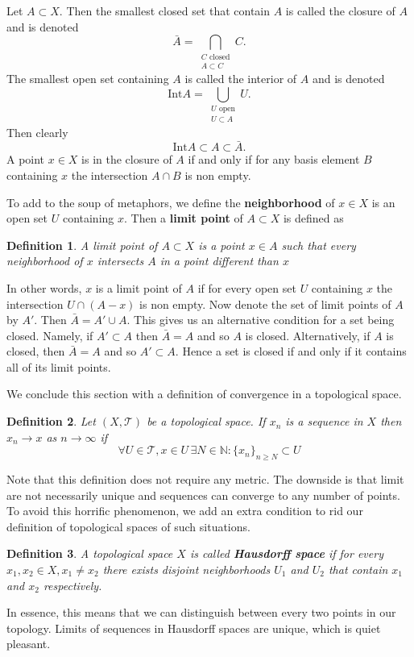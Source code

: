 \documentclass{article}
\newcommand{\Ta}{\mathcal{T}}
\newcommand{\N}{\mathbb{N}}
\newtheorem*{definition}{Definition}
\theoremstyle{remark}
\begin{document}
Let $A\subset X$. Then the smallest closed set that contain $A$ is called the closure of $A$ and is denoted 
$$\bar{A}=\bigcap_{\substack{C\text{ closed}\\A\subset C}} C.$$
The smallest open set containing $A$ is called the interior of $A$ and is denoted 
$$\text{Int} A = \bigcup_{\substack{U\text{ open}\\U\subset A}}U.$$ 
Then clearly
$$
    \text{Int}A\subset A\subset\bar{A}.
$$
A point $x\in X$ is in the closure of $A$ if and only if for any basis element $B$ containing $x$ the intersection $A\cap B$ is non empty.

To add to the soup of metaphors, we define the \textbf{neighborhood} of $x\in X$ is an open set $U$ containing $x$. Then a \textbf{limit point} of $A\subset X$ is defined as
\begin{definition}
    A limit point of $A\subset X$ is a point $x\in A$ such that every neighborhood of $x$ intersects $A$ in a point different than $x$
\end{definition}
In other words, $x$ is a limit point of $A$ if for every open set $U$ containing $x$ the intersection $U\cap(A-{x})$ is non empty. Now denote the set of limit points of $A$ by $A'$.
Then $\bar{A}=A'\cup A$. This gives us an alternative condition for a set being closed. Namely, if $A'\subset A$ then $\bar{A}=A$ and so $A$ is closed.
Alternatively, if $A$ is closed, then $\bar{A}=A$ and so $A'\subset A$.
Hence a set is closed if and only if it contains all of its limit points.

We conclude this section with a definition of convergence in a topological space.
\begin{definition}
    Let $(X,\Ta)$ be a topological space. If $x_n$ is a sequence in $X$ then $x_n\to x$ as $n\to\infty$ if
    $$
        \forall U\in\Ta, x\in U\,\exists N\in\N: \{x_n\}_{n\geq N}\subset U
    $$
\end{definition}
Note that this definition does not require any metric. The downside is that limit are not necessarily unique and sequences can converge to any number of points.
To avoid this horrific phenomenon, we add an extra condition to rid our definition of topological spaces of such situations. 
\begin{definition}
    A topological space $X$ is called \textbf{Hausdorff space} if for every $x_1,x_2\in X, x_1\neq x_2$ there exists disjoint neighborhoods $U_1$ and $U_2$ that contain $x_1$ and $x_2$ respectively.
\end{definition}
In essence, this means that we can distinguish between every two points in our topology. Limits of sequences in Hausdorff spaces are unique, which is quiet pleasant.
\end{document}
